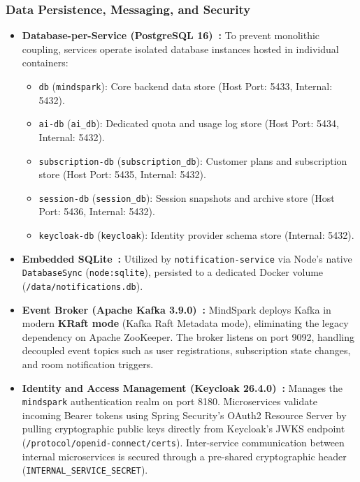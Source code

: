 \subsubsection{Data Persistence, Messaging, and Security}
\begin{itemize}[leftmargin=1.5em]
    \item \textbf{Database-per-Service (PostgreSQL 16)~\cite{postgresql2026}:} To prevent monolithic coupling, services operate isolated database instances hosted in individual containers:
    \begin{itemize}[leftmargin=1.2em]
        \item \texttt{db} (\texttt{mindspark}): Core backend data store (Host Port: 5433, Internal: 5432).
        \item \texttt{ai-db} (\texttt{ai\_db}): Dedicated quota and usage log store (Host Port: 5434, Internal: 5432).
        \item \texttt{subscription-db} (\texttt{subscription\_db}): Customer plans and subscription store (Host Port: 5435, Internal: 5432).
        \item \texttt{session-db} (\texttt{session\_db}): Session snapshots and archive store (Host Port: 5436, Internal: 5432).
        \item \texttt{keycloak-db} (\texttt{keycloak}): Identity provider schema store (Internal: 5432).
    \end{itemize}
    \item \textbf{Embedded SQLite~\cite{sqlite2026}:} Utilized by \texttt{notification-service} via Node's native \texttt{DatabaseSync} (\texttt{node:sqlite}), persisted to a dedicated Docker volume (\texttt{/data/notifications.db}).
    \item \textbf{Event Broker (Apache Kafka 3.9.0)~\cite{kafka2026}:} MindSpark deploys Kafka in modern \textbf{KRaft mode} (Kafka Raft Metadata mode), eliminating the legacy dependency on Apache ZooKeeper. The broker listens on port 9092, handling decoupled event topics such as user registrations, subscription state changes, and room notification triggers.
    \item \textbf{Identity and Access Management (Keycloak 26.4.0)~\cite{keycloak2026}:} Manages the \texttt{mindspark} authentication realm on port 8180. Microservices validate incoming Bearer tokens using Spring Security's OAuth2 Resource Server by pulling cryptographic public keys directly from Keycloak's JWKS endpoint (\texttt{/protocol/openid-connect/certs}). Inter-service communication between internal microservices is secured through a pre-shared cryptographic header (\texttt{INTERNAL\_SERVICE\_SECRET}).
\end{itemize}

